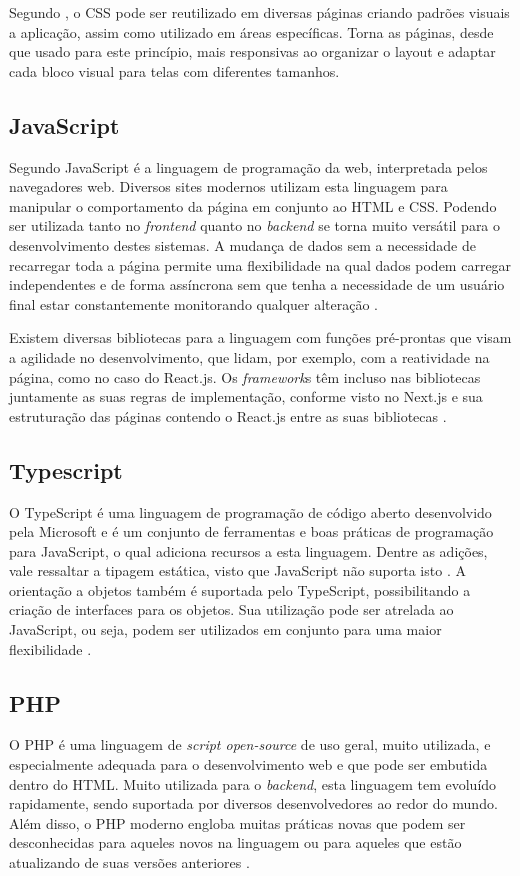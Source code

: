Segundo , o CSS pode ser reutilizado em diversas páginas criando padrões visuais a aplicação, assim como utilizado em áreas específicas. Torna as páginas, desde que usado para este princípio, mais responsivas ao organizar o layout e adaptar cada bloco visual para telas com diferentes tamanhos.

\subsection{JavaScript}
Segundo  JavaScript é a linguagem de programação da web, interpretada pelos navegadores web. Diversos sites modernos utilizam esta linguagem para manipular o comportamento da página em conjunto ao HTML e CSS. Podendo ser utilizada tanto no \textit{frontend} quanto no \textit{backend} se torna muito versátil para o desenvolvimento destes sistemas. A mudança de dados sem a necessidade de recarregar toda a página permite uma flexibilidade na qual dados podem carregar independentes e de forma assíncrona sem que tenha a necessidade de um usuário final estar constantemente monitorando qualquer alteração \cite{FLANAGAN}.

Existem diversas bibliotecas para a linguagem com funções pré-prontas que visam a agilidade no desenvolvimento, que lidam, por exemplo, com a reatividade na página, como no caso do React.js. Os \textit{framework}s têm incluso nas bibliotecas juntamente as suas regras de implementação, conforme visto no Next.js e sua estruturação das páginas contendo o React.js entre as suas bibliotecas \cite{ROBBINS}.

\subsection{Typescript}
O TypeScript é uma linguagem de programação de código aberto desenvolvido pela Microsoft e é um conjunto de ferramentas e boas práticas de programação para JavaScript, o qual adiciona recursos a esta linguagem. Dentre as adições, vale ressaltar a tipagem estática, visto que JavaScript não suporta isto \cite{TYPESCRIPT}. A orientação a objetos também é suportada pelo TypeScript, possibilitando a criação de interfaces para os objetos. Sua utilização pode ser atrelada ao JavaScript, ou seja, podem ser utilizados em conjunto para uma maior flexibilidade \cite{CHERNY}.

\subsection{PHP}
O PHP é uma linguagem de \textit{script open-source} de uso geral, muito utilizada, e especialmente adequada para o desenvolvimento web e que pode ser embutida dentro do HTML. Muito utilizada para o \textit{backend}, esta linguagem tem evoluído rapidamente, sendo suportada por diversos desenvolvedores ao redor do mundo. Além disso, o PHP moderno engloba muitas práticas novas que podem ser desconhecidas para aqueles novos na linguagem ou para aqueles que estão atualizando de suas versões anteriores \cite{LOCKHART}.

